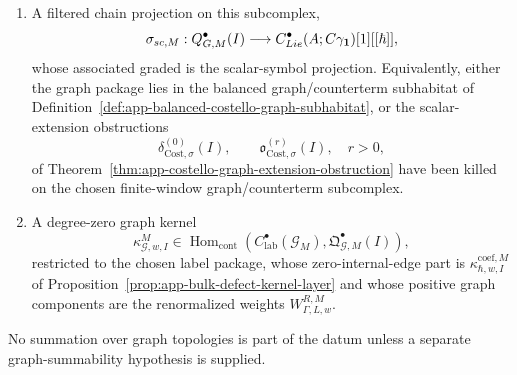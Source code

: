 \begin{defn}
\begin{enumerate}[label=(F\arabic*)]
    \item A filtered chain projection on this subcomplex,
    \[
      \sigma_{sc,M}:
      Q^\bullet_{G,M}(I)
      \longrightarrow
      C^\bullet_{Lie}(A;C\gamma_{\mathbf 1})[1][[\hbar]],
    \]
    whose associated graded is the scalar-symbol projection.  Equivalently,
    either the graph package lies in the balanced graph/counterterm
    subhabitat of
    Definition~\ref{def:app-balanced-costello-graph-subhabitat}, or the
    scalar-extension obstructions
    \[
      \delta^{(0)}_{\mathrm{Cost},\sigma}(I),
      \qquad
      \mathfrak o^{(r)}_{\mathrm{Cost},\sigma}(I),\quad r>0,
    \]
    of Theorem~\ref{thm:app-costello-graph-extension-obstruction} have been
    killed on the chosen finite-window graph/counterterm subcomplex.

    \item A degree-zero graph kernel
    \[
      \kappa^M_{\mathcal G,w,I}\in
      \operatorname{Hom}_{\mathrm{cont}}\!\left(
        C^\bullet_{\mathrm{lab}}(\mathcal G_M),
        \mathfrak Q^\bullet_{\mathcal G,M}(I)\right),
    \]
    restricted to the chosen label package, whose zero-internal-edge part
    is \(\kappa^{\mathrm{coef},M}_{\hbar,w,I}\) of
    Proposition~\ref{prop:app-bulk-defect-kernel-layer} and whose positive
    graph components are the renormalized weights
    \(W^{R,M}_{\Gamma,L,w}\).
  \end{enumerate}
  No summation over graph topologies is part of the datum unless a separate
  graph-summability hypothesis is supplied.
\end{defn}


